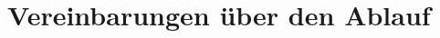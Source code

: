 \section{Vereinbarungen über den Ablauf}
\label{sec:vereinbarungen-uber-den-ablauf}

{\color{red}
    \lipsum[1] %
}
